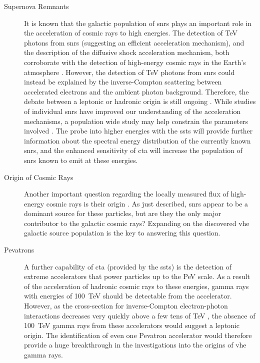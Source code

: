 \begin{description}
\item [Supernova Remnants] It is known that the galactic population of \glspl{snr} plays an important role in the acceleration of cosmic rays to high energies. The detection of \si{TeV} photons from \glspl{snr} (suggesting an efficient acceleration mechanism), and the description of the diffusive shock acceleration mechanism, both corroborate with the detection of high-energy cosmic rays in the Earth's atmosphere \cite{Cristofari2017}. However, the detection of \si{TeV} photons from \glspl{snr} could instead be explained by the inverse-Compton scattering between accelerated electrons and the ambient photon background. Therefore, the debate between a leptonic or hadronic origin is still ongoing \cite{Acharya2013}. While studies of individual \glspl{snr} have improved our understanding of the acceleration mechanisms, a population wide study may help constrain the parameters involved \cite{Cristofari2017}. The probe into higher energies with the \glspl{sst} will provide further information about the spectral energy distribution of the currently known \glspl{snr}, and the enhanced sensitivity of \gls{cta} will increase the population of \glspl{snr} known to emit at these energies.
\item [Origin of Cosmic Rays] Another important question regarding the locally measured flux of high-energy cosmic rays is their origin \cite{Bigongiari2016}. As just described, \glspl{snr} appear to be a dominant source for these particles, but are they the only major contributor to the galactic cosmic rays? Expanding on the discovered \gls{vhe} galactic source population is the key to answering this question.
\item [Pevatrons] A further capability of \gls{cta} (provided by the \glspl{sst}) is the detection of extreme accelerators that power particles up to the \si{PeV} scale. As a result of the acceleration of hadronic cosmic rays to these energies, gamma rays with energies of \SI{100}{TeV} should be detectable from the accelerator. However, as the cross-section for inverse-Compton electron-photon interactions decreases very quickly above a few tens of \si{TeV} \cite{Consortium2018}, the absence of \SI{100}{TeV} gamma rays from these accelerators would suggest a leptonic origin. The identification of even one Pevatron accelerator would therefore provide a huge breakthrough in the investigations into the origins of \gls{vhe} gamma rays.
\end{description}

